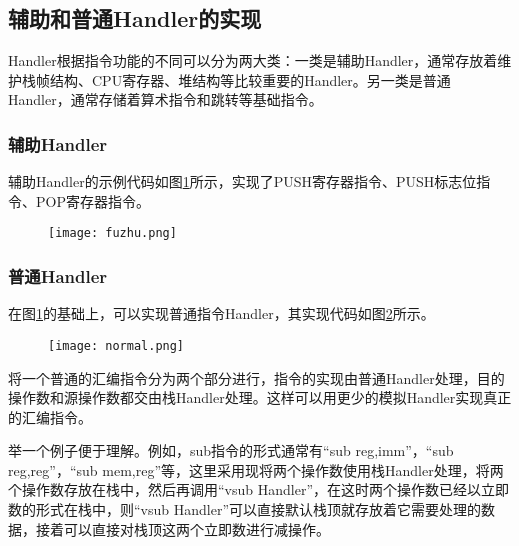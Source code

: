 \subsection{辅助和普通Handler的实现}

Handler根据指令功能的不同可以分为两大类：一类是辅助Handler，通常存放着维护栈帧结构、CPU寄存器、堆结构等比较重要的Handler。另一类是普通Handler，通常存储着算术指令和跳转等基础指令。

\subsubsection{辅助Handler}
辅助Handler的示例代码如图\ref{fuzhu}所示，实现了PUSH寄存器指令、PUSH标志位指令、POP寄存器指令。

\begin{figure}[htbp]
	\centering
	\texttt{[image: fuzhu.png]}
	\label{fuzhu}
\end{figure}

\subsubsection{普通Handler}

\label{normalhandler}
在图\ref{fuzhu}的基础上，可以实现普通指令Handler，其实现代码如图\ref{normal}所示。

\begin{figure}[htbp]
	\centering
	\texttt{[image: normal.png]}
	\label{normal}
\end{figure}


将一个普通的汇编指令分为两个部分进行，指令的实现由普通Handler处理，目的操作数和源操作数都交由栈Handler处理。这样可以用更少的模拟Handler实现真正的汇编指令。

举一个例子便于理解。例如，sub指令的形式通常有“sub reg,imm”，“sub reg,reg”，“sub mem,reg”等，这里采用现将两个操作数使用栈Handler处理，将两个操作数存放在栈中，然后再调用“vsub Handler”，在这时两个操作数已经以立即数的形式在栈中，则“vsub Handler”可以直接默认栈顶就存放着它需要处理的数据，接着可以直接对栈顶这两个立即数进行减操作。





%

